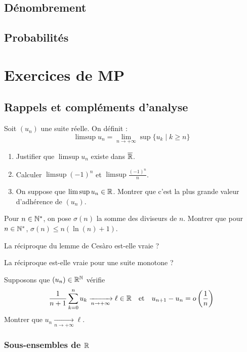 \documentclass[12pt,a4paper]{exo_book}
\begin{document}
\chapter{Dénombrement}

\chapter{Probabilités}

\part{Exercices de MP}

\chapter{Rappels et compléments d'analyse}

\begin{exo}
    Soit $(u_n)$ une suite réelle. On définit :
    \[\limsup u_n = \lim_{n\to +\infty} \sup \{u_k \mid k \ge n\}\]
    \begin{enumerate}
        \item Justifier que $\limsup u_n$ existe dans $\overline{\mathbb{R}}$.
        \item Calculer $\limsup (-1)^n$ et $\limsup \frac{(-1)^n}{n}$.
        \item On suppose que $\limsup u_n \in \mathbb{R}$. Montrer que c'est la plus grande valeur d'adhérence de $(u_n)$.
    \end{enumerate}
\end{exo}

\begin{exo}
    Pour $n \in  \mathbb{N}^*$, on pose $\sigma(n)$ la somme des diviseurs de $n$. Montrer que pour $n \in \mathbb{N}^*$, $\sigma (n) \le n (\ln(n) + 1)$.
\end{exo}

\begin{exo}
    \item La réciproque du lemme de Cesàro est-elle vraie ?
    \item La réciproque est-elle vraie pour une suite monotone ?
    \item Supposons que $(u_n) \in \mathbb{R}^{\mathbb{N}}$ vérifie
    \[\frac{1}{n+1} \sum_{k=0}^n u_k \xrightarrow[n \to +\infty]{} \ell \in \mathbb{R} \quad \text{et} \quad u_{n+1} - u_n = o\left(\frac{1}{n}\right)\]
    Montrer que $u_n \xrightarrow[n\to + \infty]{} \ell$.
\end{exo}

\section{Sous-ensembles de $\mathbb{R}$}
\end{document}
